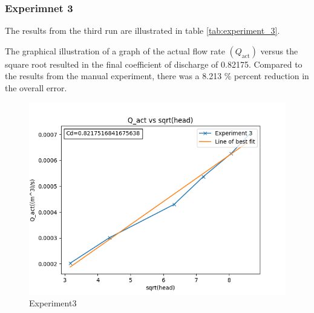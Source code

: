 \subsubsection{Experimnet 3}
\par
The results from the third run are illustrated in table \ref{tab:experiment_3}.
\begin{table}[H]
\centering
\caption{Experiment 3}
\label{tab:experiment_3}
\end{table}
\par
The graphical illustration of a graph of the actual flow rate $(Q_\text{act})$ versus the square root resulted in the final coefficient of discharge of 0.82175. Compared to the results from the manual experiment, there was a 8.213 \% percent reduction in the overall error. 
\begin{figure}[H]
            \centering
        \includegraphics[width=.85\textwidth]{Figures/Experiment3.png}
            \caption{Experiment3}
            \label{fig: Experiment3}
        \end{figure}
